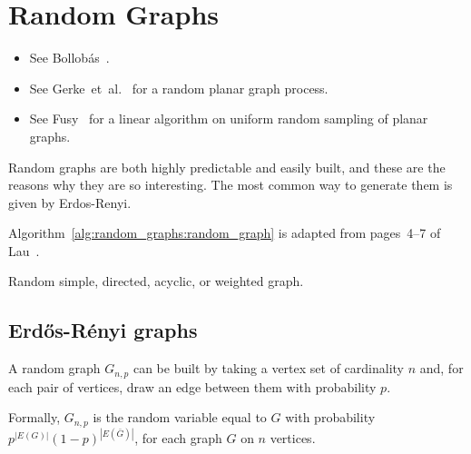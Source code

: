 
\chapter{Random Graphs}
\label{chap:random_graphs}


\begin{itemize}
\item See Bollob{\'a}s~\cite{Bollobas2001}.

\item See Gerke~et~al.~\cite{GerkeEtAl2008} for a random planar graph
  process.

\item See Fusy~\cite{Fusy2009} for a linear algorithm on uniform
  random sampling of planar graphs.
\end{itemize}

Random graphs are both highly predictable and easily built, and these are the reasons why they are so interesting. The most common way to generate them is given by Erdos-Renyi.

Algorithm~\ref{alg:random_graphs:random_graph} is adapted from
pages~4--7 of Lau~\cite{Lau2007}.

\begin{algorithm}[!htbp]

\caption{Random simple, directed, acyclic, or weighted graph.}
\label{alg:random_graphs:random_graph}
\end{algorithm}



\section{Erd\H{o}s-R{\'e}nyi graphs}


\begin{definition} A random graph $G_{n,p}$ can be built by taking a vertex set of cardinality $n$ and, for each pair of vertices, draw an edge between them with probability $p$.

Formally, $G_{n,p}$ is the random variable equal to $G$ with probability $p^{|E(G)|}(1-p)^{|E(\bar{G})|}$, for each graph $G$ on $n$ vertices.
\end{definition}

